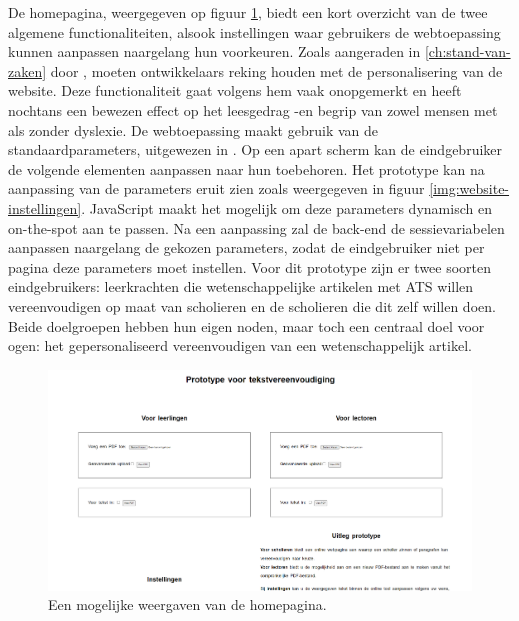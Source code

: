De homepagina, weergegeven op figuur \ref{img:homepage}, biedt een kort overzicht van de twee algemene functionaliteiten, alsook instellingen waar gebruikers de webtoepassing kunnen aanpassen naargelang hun voorkeuren. Zoals aangeraden in \ref{ch:stand-van-zaken} door \textcite{Harvard2023}, moeten ontwikkelaars reking houden met de personalisering van de website. Deze functionaliteit gaat volgens hem vaak onopgemerkt en heeft nochtans een bewezen effect op het leesgedrag -en begrip van zowel mensen met als zonder dyslexie. De webtoepassing maakt gebruik van de standaardparameters, uitgewezen in \textcite{Rello2013a, Rello2013b}. Op een apart scherm kan de eindgebruiker de volgende elementen aanpassen naar hun toebehoren. Het prototype kan na aanpassing van de parameters eruit zien zoals weergegeven in figuur \ref{img:website-instellingen}. JavaScript maakt het mogelijk om deze parameters dynamisch en on-the-spot aan te passen. Na een aanpassing zal de back-end de sessievariabelen aanpassen naargelang de gekozen parameters, zodat de eindgebruiker niet per pagina deze parameters moet instellen. Voor dit prototype zijn er twee soorten eindgebruikers: leerkrachten die wetenschappelijke artikelen met ATS willen vereenvoudigen op maat van scholieren en de scholieren die dit zelf willen doen. Beide doelgroepen hebben hun eigen noden, maar toch een centraal doel voor ogen: het gepersonaliseerd vereenvoudigen van een wetenschappelijk artikel.


\begin{center}
	\begin{figure}[H]
		\includegraphics[width=\linewidth]{img/proto-homescreen.png}
		\caption{Een mogelijke weergaven van de homepagina.}		
		\label{img:homepage}
	\end{figure}
\end{center}


